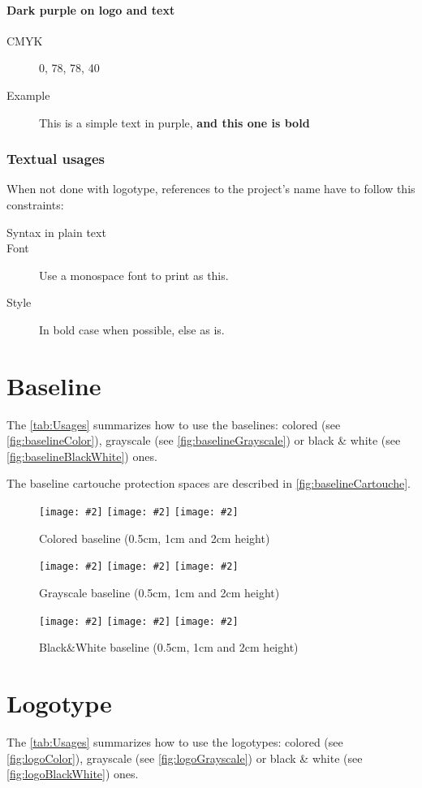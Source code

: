 \documentclass[a4paper,oneside,table]{article}
\newcommand{\proposition}[4][\textwidth]{%
    \begin{figure}[h]
        \centering
            \begin{minipage}[c]{#1}
                \centering
                \texttt{[image: \#2]}
                \vline{}
                \texttt{[image: \#2]}
                \vline{}
                \texttt{[image: \#2]}
                \caption{#3 (0.5cm, 1cm and 2cm height)}
                \label{#4}
            \end{minipage}
    \end{figure}
}
\begin{document}
\paragraph{Dark purple on logo and text}
\begin{description}
    \item[CMYK] 0, 78, 78, 40
    \item[Example] \textcolor{vilainRed}{This is a simple text in
  purple, \textbf{and this one is bold}}
\end{description}

\subsubsection{Textual usages}
When not done with logotype, references to the project's name have to follow this constraints:
\begin{description}
    \item[Syntax in plain text] \texttt{\vilain{}}
    \item[Font] Use a monospace font to print \texttt{\vilain{}} as
    this.
    \item[Style] \texttt{\vilain{}} In bold case when possible, else
    as is.
\end{description}

\cleardoublepage{}
\section{Baseline}
The \tablename{} \vref{tab:Usages} summarizes how to use the
baselines: colored (see \figurename{} \vref{fig:baselineColor}),
grayscale (see \figurename{} \vref{fig:baselineGrayscale}) or black \&
white (see \figurename{} \vref{fig:baselineBlackWhite}) ones.

The baseline cartouche protection spaces are described in
\figurename{} \vref{fig:baselineCartouche}.

\proposition{baseline_color_cmyk.pdf}{Colored
  baseline}{fig:baselineColor}
\proposition{baseline_grayscale_cmyk.pdf}{Grayscale
  baseline}{fig:baselineGrayscale}
\proposition{baseline_black-and-white_cmyk.pdf}{Black\&White
  baseline}{fig:baselineBlackWhite}

\cleardoublepage{}
\section{Logotype}
The \tablename{} \vref{tab:Usages} summarizes how to use the
logotypes: colored (see \figurename{} \vref{fig:logoColor}),
grayscale (see \figurename{} \vref{fig:logoGrayscale}) or black \&
white (see \figurename{} \vref{fig:logoBlackWhite}) ones.
\end{document}
